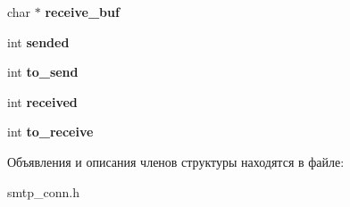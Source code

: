 \begin{DoxyCompactItemize}
\item 
char $\ast$ {\bfseries receive\+\_\+buf}\hypertarget{structSMTP__Connection_a30cbdf88ff4a726de8118c11436820e3}{}\label{structSMTP__Connection_a30cbdf88ff4a726de8118c11436820e3}

\item 
int {\bfseries sended}\hypertarget{structSMTP__Connection_a420f98bd13c75eff9b9b1f3d008ee7a4}{}\label{structSMTP__Connection_a420f98bd13c75eff9b9b1f3d008ee7a4}

\item 
int {\bfseries to\+\_\+send}\hypertarget{structSMTP__Connection_ae28eb91b287419ecfcfe7ed9edd79ff1}{}\label{structSMTP__Connection_ae28eb91b287419ecfcfe7ed9edd79ff1}

\item 
int {\bfseries received}\hypertarget{structSMTP__Connection_a92807ace75203eea54bade1494a71c1a}{}\label{structSMTP__Connection_a92807ace75203eea54bade1494a71c1a}

\item 
int {\bfseries to\+\_\+receive}\hypertarget{structSMTP__Connection_a82e5627412e39d86683afccd9df5553e}{}\label{structSMTP__Connection_a82e5627412e39d86683afccd9df5553e}

\end{DoxyCompactItemize}


Объявления и описания членов структуры находятся в файле\+:\begin{DoxyCompactItemize}
\item 
smtp\+\_\+conn.\+h\end{DoxyCompactItemize}
